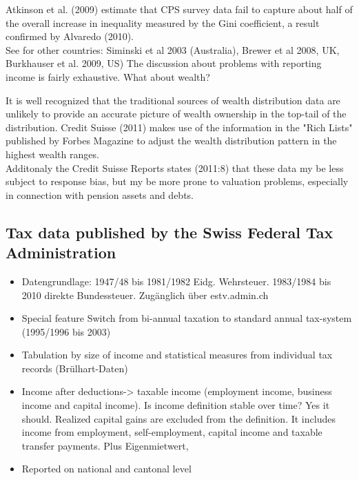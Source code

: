 \documentclass[twoside]{article}\usepackage[]{graphicx}\usepackage[]{color}
\begin{document}
\begin{multicols}{2}
Atkinson et al. (2009) estimate that CPS survey data fail to capture about half of the overall increase in inequality measured by the Gini coefficient, a result confirmed by Alvaredo (2010). \\

See for other countries: Siminski et al 2003 (Australia), Brewer et al 2008, UK, Burkhauser et al. 2009, US)
The discussion about problems with reporting income is fairly exhaustive. What about wealth?

It is well recognized that the traditional sources of wealth distribution data are unlikely to provide an accurate picture of wealth ownership in the top-tail of the distribution. Credit Suisse (2011) makes use of the information in the "Rich Lists" published by Forbes Magazine to adjust the wealth distribution pattern in the highest wealth ranges. \\

Additonaly the Credit Suisse Reports states (2011:8) that these data my be less subject to response bias, but my be more prone to valuation problems, especially in connection with pension assets and debts.

\subsection{Tax data published by the Swiss Federal Tax Administration}

\begin{itemize}
\item	Datengrundlage: 1947/48 bis 1981/1982 Eidg. Wehrsteuer. 1983/1984 bis 2010 direkte Bundessteuer. Zugänglich über estv.admin.ch
	\item	Special feature Switch from bi-annual taxation to standard annual tax-system (1995/1996 bis 2003)
	\item	Tabulation by size of income and statistical measures from individual tax records (Brülhart-Daten)
	\item	Income after deductions-> taxable income (employment income, business income and capital income). Is income definition stable over time? Yes it should. Realized capital gains are excluded from the definition. It includes income from  employment, self-employment, capital income and taxable transfer payments. Plus Eigenmietwert, 
	\item	Reported on national and cantonal level
\end{itemize}


\end{multicols}
\end{document}
